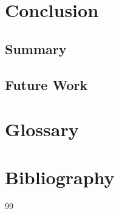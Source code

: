 
\chapter{Conclusion}
\cleardoublepage

\section{Summary}

\section{Future Work}


\appendix
\chapter{Glossary}

\chapter{Bibliography}

\begin{thebibliography}{99}
\end{thebibliography}


